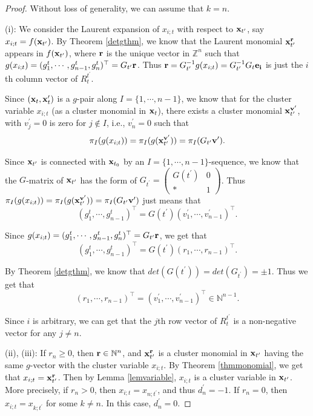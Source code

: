 \documentclass[14pt]{amsart}
\begin{document}
\begin{proof}
Without loss of generality, we can assume that $k=n$.

(i):  We consider the Laurent expansion of $x_{i;t}$ with respect to ${\bf x}_{t^{\prime}}$, say $x_{i;t}=f({\bf x}_{t^\prime})$. By Theorem \ref{detgthm}, we know that the Laurent monomial ${\bf x}_{t^\prime}^{{\bf r}}$ appears in $f({\bf x}_{t^\prime})$, where ${\bf r}$ is the unique vector in $\mathbb Z^n$ such that $g(x_{i;t})=(g_{1}^t,\cdots,g_{n-1}^t,g_{n}^t)^{\top}=G_{t^\prime}{\bf r}$. Thus ${\bf r}=G_{t^\prime}^{-1}g(x_{i;t})=G_{t^{\prime}}^{-1}G_t{\bf e_i}$ is just the $i$th column vector of $R_{t}^{t^\prime}$.

Since $({\bf x}_t,{\bf x}_t^\prime)$ is a $g$-pair along $I=\{1,\cdots,n-1\}$, we know that for the cluster variable $x_{i;t}$ (as a cluster monomial in ${\bf x}_t$), there exists a cluster monomial ${\bf x}_{t^\prime}^{{\bf v}^\prime}$, with $v_j^\prime=0$ is zero for $j\notin I$, i.e., $v_n^\prime=0$ such that $$\pi_I(g(x_{i;t}))=\pi_I(g({\bf x}_{t^{\prime}}^{{\bf v}^\prime}))=\pi_I(G_{t^\prime}{\bf v}^\prime).$$

Since ${\bf x}_{t^\prime}$ is connected with ${\bf x}_{t_0}$ by an $I=\{1,\cdots,n-1\}$-sequence, we know that the $G$-matrix of ${\bf x}_{t^\prime}$ has the form of $G_{t^{\prime}}=\begin{pmatrix}G(t^{\prime})&0\\ \ast& 1\end{pmatrix}$.
Thus  $\pi_I(g(x_{i;t}))=\pi_I(g({\bf x}_{t^{\prime}}^{{\bf v}^\prime}))=\pi_I(G_{t^\prime}{\bf v}^\prime)$ just means that
$$(g_{1}^t,\cdots,g_{n-1}^t)^{\top}=G(t^\prime)(v_{1}^\prime,\cdots,v_{n-1}^\prime)^{\top}.$$

 Since $g(x_{i;t})=(g_{1}^t,\cdots,g_{n-1}^t,g_{n}^t)^{\top}=G_{t^\prime}{\bf r}$, we get that  $$(g_{1}^t,\cdots,g_{n-1}^t)^{\top}=G(t^\prime)(r_{1},\cdots,r_{n-1})^{\top}.$$

By Theorem \ref{detgthm}, we know that $det(G(t^\prime))=det(G_{t^{\prime}})=\pm1$. Thus we get that $$(r_{1},\cdots,r_{n-1})^{\top}=(v_{1}^\prime,\cdots,v_{n-1}^\prime)^{\top}\in\mathbb N^{n-1}.$$

Since $i$ is arbitrary, we can get that the $j$th row  vector of $R_{t}^{t^\prime}$ is a non-negative vector for any $j\neq n$.

(ii), (iii): If $r_{n}\geq 0$, then ${\bf r}\in \mathbb N^n$, and ${\bf x}_{t^\prime}^{{\bf r}}$ is a cluster monomial in ${\bf x}_{t^\prime}$ having the same $g$-vector  with the cluster variable $x_{i;t}$. By Theorem \ref{thmmonomial}, we get that $x_{i;t}={\bf x}_{t^\prime}^{{\bf r}}$. Then by Lemma \ref{lemvariable}, $x_{i;t}$ is a cluster variable in ${\bf x}_{t^\prime}$. More precisely, if $r_{n}>0$, then $x_{i;t}=x_{n;t^{\prime}}$, and thus $d_{n}^\prime=-1$. If $r_{n}=0$, then $x_{i;t}=x_{k;t^\prime}$ for some $k\neq n$. In this case, $d_{n}^\prime=0$.


\end{proof}
\end{document}

